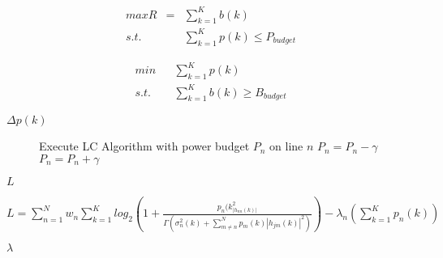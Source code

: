 {
{\newpage\clearpage
{}%
\begin{displaymath}\begin{array}{rcl}   max R&=&\sum_{k=1}^Kb(k)\\s.t.&&\sum\limits_{k=1}^Kp(k)\leq P_{budget}   \end{array}\end{displaymath}%
\lthtmldisplayZ
\lthtmlcheckvsize\clearpage}

{\newpage\clearpage
{}%
\begin{displaymath}\begin{array}{rcl}   min &&\sum\limits_{k=1}^Kp(k)\\s.t.&&\sum\limits_{k=1}^Kb(k)\geq B_{budget}   \end{array}\end{displaymath}%
\lthtmldisplayZ
\lthtmlcheckvsize\clearpage}

{\newpage\clearpage
{}%
$ \Delta p(k)$%
\lthtmlinlinemathZ
\lthtmlcheckvsize\clearpage}

{\newpage\clearpage
{}%
\begin{figure}\begin{algorithmic}
\REPEAT
{}
\STATE Execute LC Algorithm with power budget \(P_n\) on line \(n\)
\STATE \(P_n=P_n-\gamma\)
\ELSE
\STATE \(P_n=P_n+\gamma\)
\ENDIF
\ENDFOR
{}
\end{algorithmic}

\end{figure}%
\lthtmlfigureZ
\lthtmlcheckvsize\clearpage}

{\newpage\clearpage
{}%
$ L$%
\lthtmlinlinemathZ
\lthtmlcheckvsize\clearpage}

{\newpage\clearpage
{}%
$\displaystyle L=\sum\limits_{n=1}^N w_n \sum\limits_{k=1}^K log_2 \left(1+\frac{p_n(k_|h_{nn}(k)|^2}{\Gamma\left(\sigma_n^2(k)+\sum\limits_{m\neq n}^N p_m(k)|h_{jm}(k)|^2\right)}\right)-\lambda_n\left(\sum\limits_{k=1}^K p_n(k)\right)$%
\lthtmlindisplaymathZ
\lthtmlcheckvsize\clearpage}

{\newpage\clearpage
{}%
$ \lambda$%
\lthtmlinlinemathZ
\lthtmlcheckvsize\clearpage}

}
